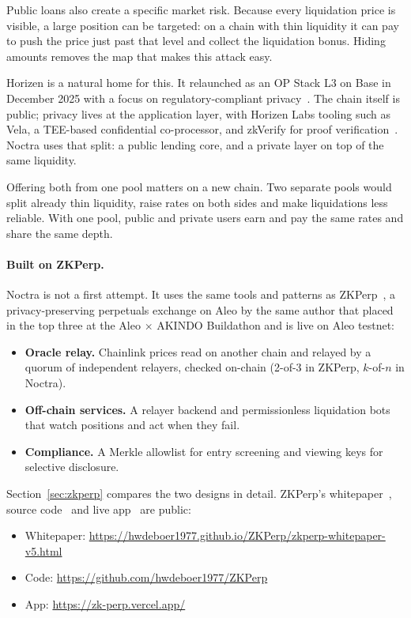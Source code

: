 \documentclass[11pt,a4paper]{article}
\begin{document}
Public loans also create a specific market risk. Because every liquidation price is visible, a large position
can be targeted: on a chain with thin liquidity it can pay to push the price just past that level and collect
the liquidation bonus. Hiding amounts removes the map that makes this attack easy.

Horizen is a natural home for this. It relaunched as an OP Stack L3 on Base in December 2025 with a focus on
regulatory-compliant privacy~\citep{theblock2025}. The chain itself is public; privacy lives at the application
layer, with Horizen Labs tooling such as Vela, a TEE-based confidential co-processor, and zkVerify for proof
verification~\citep{horizen2026}. Noctra uses that split: a public lending core, and a private layer on top of
the same liquidity.

Offering both from one pool matters on a new chain. Two separate pools would split already thin liquidity,
raise rates on both sides and make liquidations less reliable. With one pool, public and private users earn and
pay the same rates and share the same depth.

\paragraph{Built on ZKPerp.} Noctra is not a first attempt. It uses the same tools and patterns as
ZKPerp~\citep{zkperp}, a privacy-preserving perpetuals exchange on Aleo by the same author that placed in the top
three at the Aleo $\times$ AKINDO Buildathon and is live on Aleo testnet:
\begin{itemize}
  \item \textbf{Oracle relay.} Chainlink prices read on another chain and relayed by a quorum of independent
        relayers, checked on-chain (2-of-3 in ZKPerp, $k$-of-$n$ in Noctra).
  \item \textbf{Off-chain services.} A relayer backend and permissionless liquidation bots that watch positions
        and act when they fail.
  \item \textbf{Compliance.} A Merkle allowlist for entry screening and viewing keys for selective disclosure.
\end{itemize}
Section~\ref{sec:zkperp} compares the two designs in detail. ZKPerp's whitepaper~\citep{zkperp}, source
code~\citep{zkperpcode} and live app~\citep{zkperpapp} are public:
\begin{itemize}[itemsep=0pt]
  \item Whitepaper: \url{https://hwdeboer1977.github.io/ZKPerp/zkperp-whitepaper-v5.html}
  \item Code: \url{https://github.com/hwdeboer1977/ZKPerp}
  \item App: \url{https://zk-perp.vercel.app/}
\end{itemize}
\end{document}
